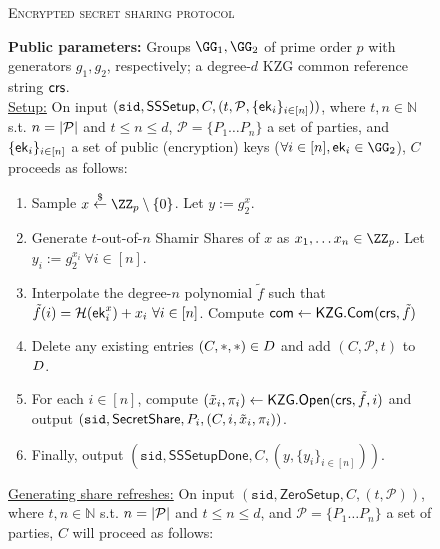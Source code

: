 \begin{figure*}
    \centering
    \begin{mdframed}
\renewcommand{\labelitemi}{\textendash}
\begin{center}
    \textsc{Encrypted secret sharing protocol}
\end{center}
\textbf{Public parameters:} Groups $\GG_1, \GG_2$ of prime order $p$ with generators $g_1, g_2$, respectively; a degree-$d$ KZG common reference string $\mathsf{crs}$.\hfill\\

\underline{Setup:}
On input $(\texttt{sid},\mathsf{SSSetup}, C, (t, \mathcal{P}, \{\mathsf{ek}_i\}_{i \in [n]}))$, where $t,n \in \mathbb{N}$ s.t. $n = \lvert \mathcal{P} \rvert$ and $t \leq n \leq d$, $\mathcal{P} = \{P_1 \ldots P_n\}$ a set of parties, and $\{\mathsf{ek}_i\}_{i \in [n]}$ a set of public (encryption) keys ($\forall i \in [n], \ek_i \in \GG_2$), $C$ proceeds as follows:
    \begin{enumerate}
    \item Sample $x \sample \ZZ_p \setminus \{0\}$. 
    Let $y := g_2^x$.
    \item Generate $t$-out-of-$n$ Shamir Shares of $x$ as $x_1, \ldots x_n \in \ZZ_p$. Let $y_i := g_2^{x_i}~\forall i \in [n]$.
    \item Interpolate the degree-$n$ polynomial $\tilde{f}$ such that $\tilde{f}(i) = \mathcal{H}(\mathsf{ek}_i^x) + x_i~\forall i\in [n]$. Compute $\mathsf{com} \gets \mathsf{KZG}.\mathsf{Com}(\mathsf{crs}, \tilde{f})$ %
    \item Delete any existing entries $(C, *, *) \in D$ and add $(C, \mathcal{P}, t)$ to $D$.
    \item For each $i \in [n]$, compute $(\tilde{x}_i, \pi_i) \gets \mathsf{KZG}.\mathsf{Open}(\mathsf{crs}, \tilde{f}, i)$ and output $(\texttt{sid},\mathsf{SecretShare}, P_i,\allowbreak (C, i, \tilde{x}_i, \pi_i))$.
    \item Finally, output $(\texttt{sid}, \mathsf{SSSetupDone}, C, (y, \{y_i\}_{i \in [n]}))$.
    \end{enumerate}
\underline{Generating share refreshes:}
On input $(\texttt{sid},\mathsf{ZeroSetup}, C, (t, \mathcal{P}))$, where $t,n \in \mathbb{N}$ s.t. $n = \lvert \mathcal{P} \rvert$ and $t \leq n \leq d$, and $\mathcal{P} = \{P_1 \ldots P_n\}$ a set of parties, $C$ will proceed as follows:
    \begin{enumerate}

\end{enumerate}
\end{mdframed}
\end{figure*}
